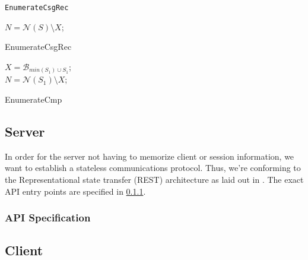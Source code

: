 \texttt{EnumerateCsgRec}
\begin{algorithm}
    \BlankLine
    $N = \mathcal{N}(S) \setminus X$;\\
\vspace{0.5cm}
\caption{EnumerateCsgRec}
\end{algorithm}

\begin{algorithm}
    \BlankLine
    $X = \mathcal{B}_{min(S_1) \cup S_1}$;\\
    $N = \mathcal{N}(S_1)\setminus X$;\\
    \vspace{0.5cm}
    \caption{EnumerateCmp}    
\end{algorithm}

\subsection{Server}

In order for the server not having to memorize client or session information, we want to establish a stateless communications protocol.
Thus, we're conforming to the Representational state transfer (REST) architecture as laid out in \cite{fielding2000architectural}.
The exact API entry points are specified in \ref{sub:api-entry-points}.

\subsubsection{API Specification}
\label{sub:api-entry-points}

\subsection{Client}

